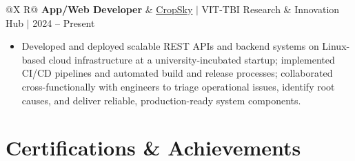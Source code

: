 \documentclass[a4paper,10pt]{article}
\newcommand{\ulink}[2]{\href{#1}{\uline{#2}}}
\newcommand{\subheading}[1]{{\color[HTML]{0A0A0A}\fontsize{12}{14}\selectfont\bfseries #1}}
\newcommand{\meta}[1]{{\color[HTML]{5C5C5C}\fontsize{10.5}{12.5}\selectfont #1}}
\begin{document}
\vspace{4pt}

\begin{tabularx}{\linewidth}{@{}X R@{}}
\subheading{App/Web Developer} & \meta{\ulink{https://sites.google.com/view/cropsky/home}{CropSky} $|$ VIT-TBI Research \& Innovation Hub $|$ 2024 -- Present}
\end{tabularx}
\begin{itemize}[nosep, leftmargin=1.5em, itemsep=1pt, topsep=2pt]
\item {\color[HTML]{0A0A0A}\fontsize{11}{14}\selectfont
Developed and deployed scalable REST APIs and backend systems on Linux-based cloud infrastructure at a university-incubated startup; implemented CI/CD pipelines and automated build and release processes; collaborated cross-functionally with engineers to triage operational issues, identify root causes, and deliver reliable, production-ready system components.}
\end{itemize}

\vspace{2pt}

\section{Certifications \& Achievements}
\vspace{2pt}
\end{document}

